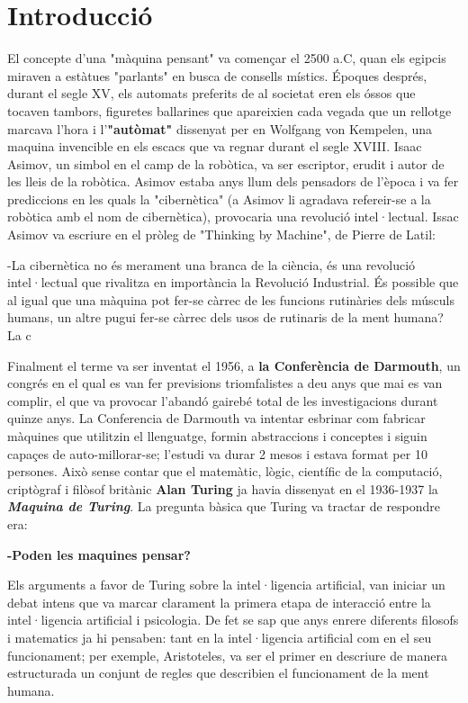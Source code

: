 \section{Introducció}

El concepte d'una "màquina pensant" va començar el 2500 a.C, quan els egipcis miraven a estàtues "parlants" en busca de consells místics. Époques després, durant el segle XV, els automats preferits de al societat eren els óssos que tocaven tambors, figuretes ballarines que apareixien cada vegada que un rellotge marcava l'hora i l'\textbf{"autòmat"} dissenyat per en Wolfgang von Kempelen, una maquina invencible en els escacs que va regnar durant el segle XVIII. Isaac Asimov, un simbol en el camp de la robòtica, va ser escriptor, erudit i autor de les lleis de la robòtica. Asimov estaba anys llum dels pensadors de l'època i va fer prediccions en les quals la "cibernètica" (a Asimov li agradava refereir-se a la robòtica amb el nom de cibernètica), provocaria una revolució intel·lectual. 
Issac Asimov va escriure en el pròleg de "Thinking by Machine", de Pierre de Latil:

-La cibernètica no és merament una branca de la ciència, és una revolució intel·lectual que rivalitza en importància la Revolució Industrial. És possible que al igual que una màquina pot fer-se càrrec de les funcions rutinàries dels músculs humans, un altre pugui fer-se càrrec dels usos de rutinaris de la ment humana?
La c

Finalment el terme va ser inventat el 1956, a \textbf{la Conferència de Darmouth}, un congrés en el qual es van fer previsions triomfalistes a deu anys que mai es van complir, el que va provocar l'abandó gairebé total de les investigacions durant quinze anys. La Conferencia de Darmouth va intentar esbrinar com fabricar màquines que utilitzin el llenguatge, formin abstraccions i conceptes i siguin capaçes de auto-millorar-se; l'estudi va durar 2 mesos i estava format per 10 persones. Això sense contar que el matemàtic, lògic, científic de la computació, criptògraf  i filòsof britànic \textbf{Alan Turing} ja havia dissenyat en el 1936-1937 la \textbf{\emph{Maquina de Turing}}. La pregunta bàsica que Turing va tractar de respondre era:  \cite{Matur}

\textbf{-Poden les maquines pensar?}

Els arguments a favor de Turing sobre la intel·ligencia artificial, van iniciar un debat intens que va marcar clarament la primera etapa de interacció entre la intel·ligencia artificial i psicologia. De fet se sap que anys enrere diferents filosofs i matematics ja hi pensaben: tant en la intel·ligencia artificial com en el seu funcionament; per exemple, Aristoteles, va ser el primer en descriure de manera estructurada un conjunt de regles que describien el funcionament de la ment humana. \cite{IAgen} \cite{IAgenII}

